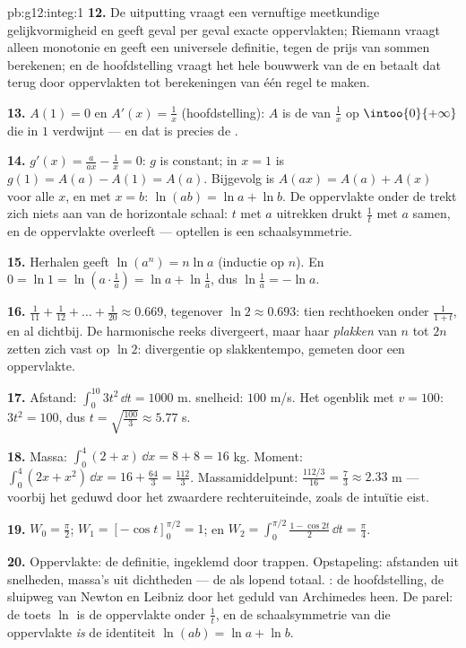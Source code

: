 \begin{solution}{pb:g12:integ:1}
\textbf{12.} De uitputting vraagt een vernuftige meetkundige gelijkvormigheid
en geeft geval per geval exacte oppervlakten; Riemann vraagt alleen monotonie
en geeft een universele definitie, tegen de prijs van sommen berekenen; en de
hoofdstelling vraagt het hele bouwwerk van de  en betaalt dat terug
door oppervlakten tot berekeningen van één regel te maken.

\textbf{13.} $A(1) = 0$ en $A'(x) = \frac1x$ (hoofdstelling): $A$ is de
 van $\frac1x$ op $\intoo{0}{+\infty}$ die in $1$
verdwijnt --- en dat is precies de .

\textbf{14.} $g'(x) = \frac{a}{ax} - \frac1x = 0$: $g$ is constant; in
$x = 1$ is $g(1) = A(a) - A(1) = A(a)$. Bijgevolg is $A(ax) = A(a) + A(x)$
voor alle $x$, en met $x = b$: $\ln(ab) = \ln a + \ln b$. De oppervlakte
onder de  trekt zich niets aan van de horizontale schaal: $t$ met
$a$ uitrekken drukt $\frac1t$ met $a$ samen, en de oppervlakte overleeft ---
 optellen is een schaalsymmetrie.

\textbf{15.} Herhalen geeft $\ln(a^n) = n\ln a$ (inductie op $n$). En
$0 = \ln 1 = \ln\left(a \cdot \frac1a\right) = \ln a + \ln\frac1a$, dus
$\ln\frac1a = -\ln a$.

\textbf{16.} $\frac{1}{11} + \frac{1}{12} + \dots + \frac{1}{20} \approx
0.669$, tegenover $\ln 2 \approx 0.693$: tien rechthoeken onder
$\frac{1}{1+t}$, en al dichtbij. De harmonische reeks divergeert, maar haar
\emph{plakken} van $n$ tot $2n$ zetten zich vast op $\ln 2$: divergentie op
slakkentempo, gemeten door een oppervlakte.

\textbf{17.} Afstand: $\int_0^{10} 3t^2\,\dd t = 1000$ m. 
snelheid: $100$ m/s. Het ogenblik met $v = 100$: $3t^2 = 100$, dus
$t = \sqrt{\frac{100}{3}} \approx 5.77$ s.

\textbf{18.} Massa: $\int_0^4 (2 + x)\,\dd x = 8 + 8 = 16$ kg. Moment:
$\int_0^4 (2x + x^2)\,\dd x = 16 + \frac{64}{3} = \frac{112}{3}$.
Massamiddelpunt: $\frac{112/3}{16} = \frac73 \approx 2.33$ m --- voorbij het
 geduwd door het zwaardere rechteruiteinde, zoals de intuïtie eist.

\textbf{19.} $W_0 = \frac\pi2$; $W_1 = \left[-\cos t\right]_0^{\pi/2} = 1$;
en $W_2 = \int_0^{\pi/2} \frac{1 - \cos 2t}{2}\,\dd t = \frac\pi4$.

\textbf{20.} Oppervlakte: de definitie, ingeklemd door trappen. Opstapeling:
afstanden uit snelheden, massa's uit dichtheden --- de  als lopend
totaal. : de hoofdstelling, de sluipweg van Newton en
Leibniz door het geduld van Archimedes heen. De parel: de toets $\ln$ is de
oppervlakte onder $\frac1t$, en de schaalsymmetrie van die oppervlakte
\emph{is} de identiteit $\ln(ab) = \ln a + \ln b$.
\end{solution}
